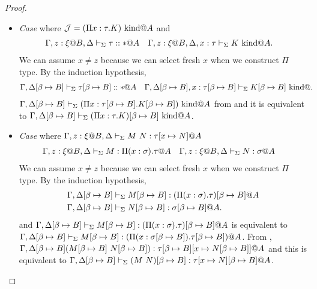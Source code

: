 \begin{proof}
\begin{itemize}
		\item[] \textit{Case} \WAbs{} where \( \mathcal{J} =  (\Pi x:\tau.K) \text{\ kind} @A\) and
		      \begin{align*}	      	      	      
		      	  & \G, z:\xi@B, \D \V \tau::*@A &   & \G, z:\xi@B, \D, x:\tau \V K \iskind@A. 
		      \end{align*}
		      We can assume $x \neq z$ because we can select fresh $x$ when we construct $\Pi$ type.
		      By the induction hypothesis,
		      \begin{align*}
		      	  & \G,\D\SB \V \tau\SB::*@A &   & \G,\D\SB, x:\tau\SB \V K\SB \iskind@. 
		      \end{align*}
		      $\Gamma,\Delta[\beta \mapsto B] \vdash_\Sigma (\Pi x:\tau[\beta \mapsto B].K[\beta \mapsto B]) \text{\ kind} @A$ from \WAbs and 
		      it is equivalent to $\Gamma,\Delta[\beta \mapsto B] \vdash_\Sigma (\Pi x:\tau.K)[\beta \mapsto B] \text{\ kind} @A$.
		      \vspace{3mm}
		      
		\item[] \textit{Case} \TApp{} where \( \G, z:\xi@B, \D \V M\ N:\tau[x\mapsto N]@A \)
		      \begin{align*}
		      	  & \G, z:\xi@B, \D \V M:\Pi(x:\sigma).\tau@A && \G, z:\xi@B, \D \V N:\sigma@A 
		      \end{align*}
		      We can assume $x \neq z$ because we can select fresh $x$ when we construct $\Pi$ type.
		      By the induction hypothesis,
		      \begin{align*}
		      	  & \G, \D\SB \V M\SB: (\Pi(x:\sigma).\tau)\SB@A \\
		      	  & \G,\D\SB\V N\SB: \sigma\SB@A.                
		      \end{align*}
		      and \(\G, \D\SB \V M\SB: (\Pi(x:\sigma).\tau)\SB@A\) is equivalent to \( \Gamma, \Delta[\beta \mapsto B] \vdash_\Sigma M[\beta \mapsto B]: (\Pi(x:\sigma[\beta \mapsto B]).\tau[\beta \mapsto B])@A \).
		      From \TApp, \(\Gamma,\Delta[\beta \mapsto B] (M[\beta \mapsto B]\ N[\beta \mapsto B]): \tau[\beta \mapsto B][x \mapsto N[\beta \mapsto B]]@A\) and this is equivalent to
		      \(\G,\D\SB \V (M\ N)\SB: \tau[x \mapsto N]\SB@A\).
	\end{itemize}
\end{proof}

				
				
				
	      	      	      	      
	      	      	      	      
